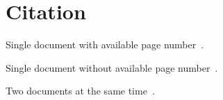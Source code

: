 \section{Citation}

Single document with available page number~.

Single document without available page number~.

Two documents at the same time~.
